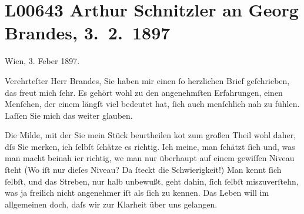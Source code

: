 

\section[Arthur Schnitzler an Georg Brandes, 3. 2. 1897]{L00643 Arthur Schnitzler an Georg Brandes, 3. 2. 1897}
\nopagebreak{}
\rehead{ }\normalsize\beginnumbering{}
\toendnotes[C]{\smallbreak\pagebreak[2]}
\toendnotes[C]{\smallbreak}
\pstart
           \raggedleft{}{\pb}Wien, 3. Feber 1897.\pend
           
\pstart{}Verehrteſter Herr Brandes,\pend\vspace{0.5em}
\pstart
           Sie haben mir einen ſo herzlichen Brief geſchrieben, das freut mich ſehr. Es gehört
               wohl zu den angenehmſten Erfahrungen, einen Menſchen, der einem längſt viel bedeutet
               hat, ſich auch menſchlich nah zu fühlen. Laſſen Sie mich das weiter glauben.\pend
           
\pstart
           Die Milde, mit der Sie mein Stück beurtheilen ko{\geminationm}t zum großen Theil wohl
               daher, dſs Sie merken, ich ſelbſt ſchätze es richtig. {\pb}Ich meine, man ſchätzt ſich und, was man macht
               beinah i{\geminationm}er richtig, we{\geminationn}
               man nur überhaupt auf einem gewiſſen Niveau ſteht (Wo iſt nur dieſes Niveau? Da
               ſteckt die Schwierigkeit!) Man kennt ſich ſelbſt, und das Streben, nur halb unbewußt,
               geht dahin, ſich \introOben{}ſelbſt\introOben{} miszuverſtehn, was ja freilich nicht
               angenehmer iſt als ſich zu kennen. Das Leben will im allgemeinen doch, daſs wir zur
               Klarheit über uns gelangen.\pend
           
